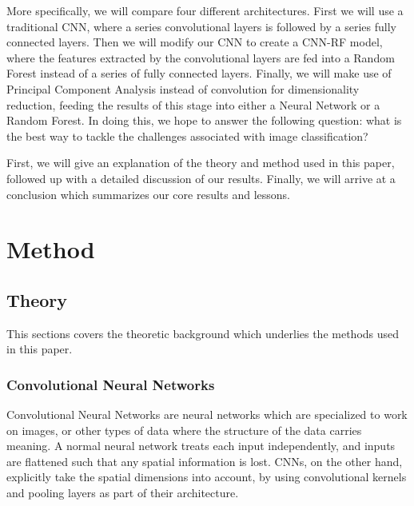 \documentclass[onecolumn,10pt,cleanfoot]{asme2ej}
\begin{document}
More specifically, we will compare four different architectures. First we will use a traditional CNN, where a series convolutional layers is followed by a series fully connected layers. Then we will modify our CNN to create a CNN-RF model, where the features extracted by the convolutional layers are fed into a Random Forest instead of a series of fully connected layers. Finally, we will make use of Principal Component Analysis instead of convolution for dimensionality reduction, feeding the results of this stage into either a Neural Network or a Random Forest. In doing this, we hope to answer the following question: what is the best way to tackle the challenges associated with image classification?


First, we will give an explanation of the theory and method used in this paper, followed up with a detailed discussion of our results. Finally, we will arrive at a conclusion which summarizes our core results and lessons.

\section{Method}

\subsection{Theory}

This sections covers the theoretic background which underlies the methods used in this paper.

\subsubsection{Convolutional Neural Networks}

Convolutional Neural Networks are neural networks which are specialized to work on images, or other types of data where the structure of the data carries meaning. A normal neural network treats each input independently, and inputs are flattened such that any spatial information is lost. CNNs, on the other hand, explicitly take the spatial dimensions into account, by using convolutional kernels and pooling layers as part of their architecture.
\end{document}
